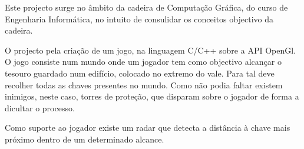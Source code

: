 




Este projecto surge no âmbito da cadeira de Computação Gráfica, do curso de Engenharia Informática, no intuito de consulidar os conceitos objectivo da cadeira.

O projecto pela criação de um jogo, na linguagem C/C++ sobre a API OpenGl. O jogo consiste num mundo onde um jogador tem como objectivo alcançar o tesouro guardado num edifício, colocado no extremo do vale. Para tal deve recolher todas as chaves presentes no mundo. Como não podia faltar existem inimigos, neste caso, torres de proteção, que disparam sobre o jogador de forma a dicultar o processo.

Como suporte ao jogador existe um radar que detecta a distância à chave mais próximo dentro de um determinado alcance.




